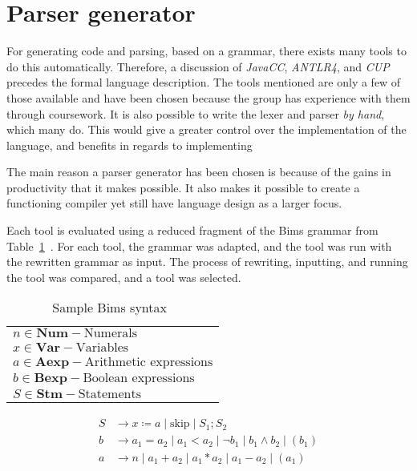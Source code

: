 \section{Parser generator}\label{sec:parsergenerator}
For generating code and parsing, based on a grammar, there exists many tools to do this automatically. Therefore, a discussion of \textit{JavaCC}, \textit{ANTLR4}, and \textit{CUP} precedes the formal language description. The tools mentioned are only a few of those available and have been chosen because the group has experience with them through coursework. It is also possible to write the lexer and parser \textit{by hand}, which many do. This would give a greater control over the implementation of the language, and benefits in regards to implementing

The main reason a parser generator has been chosen is because of the gains in productivity that it makes possible. It also makes it possible to create a functioning compiler yet still have language design as a larger focus.

Each tool is evaluated using a reduced fragment of the Bims grammar from Table~\ref{tab:bimsgrammar}~\cite{Huttel2010}. For each tool, the grammar was adapted, and the tool was run with the rewritten grammar as input. The process of rewriting, inputting, and running the tool was compared, and a tool was selected.


\begin{table}[htb!]
  \centering
  \begin{tabular}{l}
    $n \in \textbf{Num} - \text{Numerals}$                \\
    $x \in \textbf{Var} - \text{Variables}$               \\
    $a \in \textbf{Aexp} - \text{Arithmetic expressions}$ \\
    $b \in \textbf{Bexp} - \text{Boolean expressions}$    \\
    $S \in \textbf{Stm} - \text{Statements}$              \\
  \end{tabular}
  \begin{align*}
    S & \rightarrow x \coloneqq a \mid \text{skip} \mid S_1;S_2                          \\
    b & \rightarrow a_1 = a_2 \mid a_1 < a_2 \mid \neg b_1 \mid b_1 \land b_2 \mid (b_1) \\
    a & \rightarrow n \mid a_1 + a_2 \mid a_1 * a_2 \mid a_1 - a_2 \mid (a_1)
  \end{align*}
  \caption{Sample Bims syntax~\cite{Huttel2010}}
  \label{tab:bimsgrammar}
\end{table}


